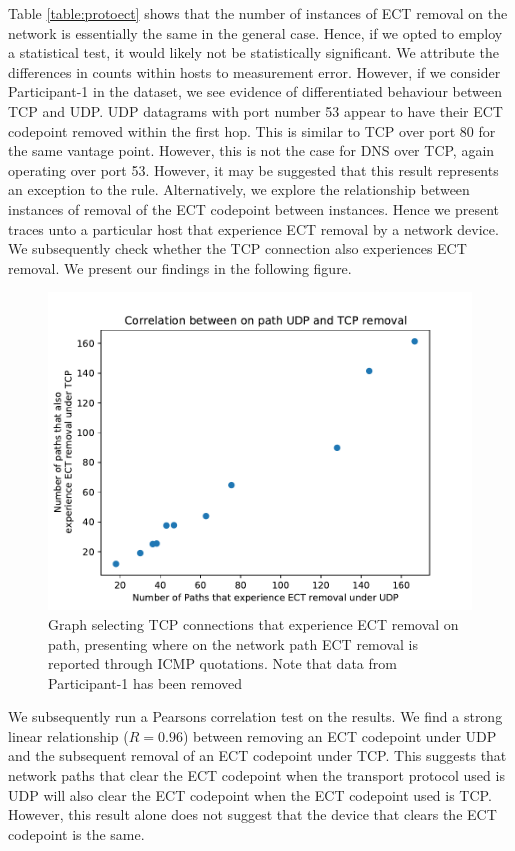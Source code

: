 \documentclass{l4proj}
\begin{document}
Table \ref{table:protoect} shows that the number of instances of ECT removal on the network is essentially the same in the general case. Hence, if we opted to employ a statistical test, it would likely not be statistically significant. We attribute the differences in counts within hosts to measurement error. However, if we consider Participant-1 in the dataset, we see evidence of differentiated behaviour between TCP and UDP. UDP datagrams with port number 53 appear to have their ECT codepoint removed within the first hop. This is similar to TCP over port 80 for the same vantage point. However, this is not the case for DNS over TCP, again operating over port 53. However, it may be suggested that this result represents an exception to the rule. Alternatively, we explore the relationship between instances of removal of the ECT codepoint between instances. Hence we present traces unto a particular host that experience ECT removal by a network device. We subsequently check whether the TCP connection also experiences ECT removal. We present our findings in the following figure.

\begin{figure}[H]
    \centering
    \includegraphics[scale=0.75]{dissertation/images/tcpudp.pdf}
    \caption{Graph selecting TCP connections that experience ECT removal on path, presenting where on the network path ECT removal is reported through ICMP quotations. Note that data from Participant-1 has been removed}
    \label{fig:tcppreserve}
\end{figure}

We subsequently run a Pearsons correlation test on the results. We find a strong linear relationship ($ R=0.96 $) between removing an ECT codepoint under UDP and the subsequent removal of an ECT codepoint under TCP. This suggests that network paths that clear the ECT codepoint when the transport protocol used is UDP will also clear the ECT codepoint when the ECT codepoint used is TCP. However, this result alone does not suggest that the device that clears the ECT codepoint is the same.
\end{document}
